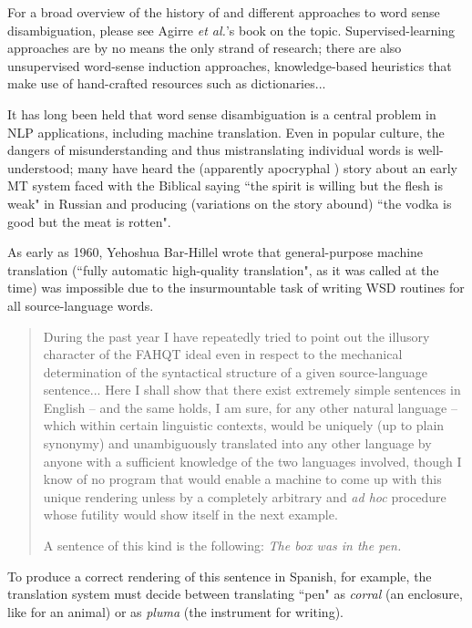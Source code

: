 For a broad overview of the history of and different approaches to word sense
disambiguation, please see Agirre \emph{et al.}'s book on the topic.
\cite{agirre2006word}
Supervised-learning approaches are by no means the only strand of research;
there are also unsupervised word-sense induction approaches,
knowledge-based heuristics that make use of hand-crafted resources such as
dictionaries...

It has long been held that word sense disambiguation is a central problem in
NLP applications, including machine translation.
Even in popular culture, the dangers of misunderstanding and thus
mistranslating individual words is well-understood; many have heard the
(apparently apocryphal \cite{hutchins:whiskey}) story about an early MT system
faced with the Biblical saying ``the spirit is willing but the flesh is
weak" in Russian and producing (variations on the story abound) ``the vodka is
good but the meat is rotten".

As early as 1960, Yehoshua Bar-Hillel wrote that general-purpose machine
translation (``fully automatic high-quality  translation", as it was  called at
the  time) was impossible due to the insurmountable task of writing WSD
routines for all source-language words. \cite{barhillel1960}

\begin{quote}
During the past year I have repeatedly tried to point out the illusory
character of the FAHQT ideal even in respect to the mechanical determination of
the syntactical structure of a given source-language sentence... Here I shall
show that there exist extremely simple sentences in English -- and the same
holds, I am sure, for any other natural language -- which within certain
linguistic contexts, would be uniquely (up to plain synonymy) and unambiguously
translated into any other language by anyone with a sufficient knowledge of the
two languages involved, though I know of no program that would enable a machine
to come up with this unique rendering unless by a completely arbitrary and
\emph{ad hoc} procedure whose futility would show itself in the next example.

A sentence of this kind is the following: \emph{The box was in the pen.}
\end{quote}

To produce a correct rendering of this sentence in Spanish, for example, the
translation system must decide between translating ``pen" as \emph{corral} (an
enclosure, like for an animal) or as \emph{pluma} (the instrument for writing).

